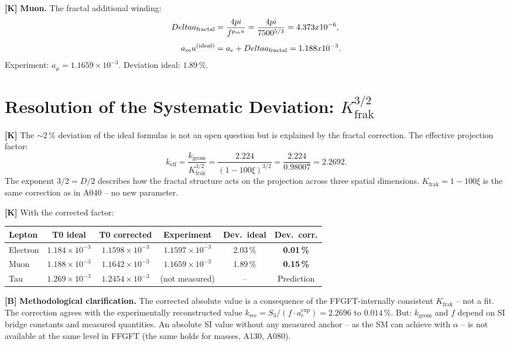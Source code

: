 \textbf{[K]} \textbf{Muon.} The fractal additional winding:
\begin{align}
  \Delta a_\text{fractal} &= \frac{4\pi}{f^{p_\mu}} = \frac{4\pi}{7500^{5/3}}
  = 4{.}373\times10^{-6}, \notag\\[4pt]
  a_\mu^\text{(ideal)} &= a_e + \Delta a_\text{fractal} = 1{.}188\times10^{-3}. \notag
\end{align}
Experiment: $a_\mu=1{.}1659\times10^{-3}$. Deviation ideal: $1{.}89\,\%$.

\section{Resolution of the Systematic Deviation: \texorpdfstring{$K_\text{frak}^{3/2}$}{K\_frak\textasciicircum 3/2}}

\textbf{[K]} The $\sim2\,\%$ deviation of the ideal formulas is not an open
question but is explained by the fractal correction. The effective projection
factor:
\[
  k_\text{eff}
  = \frac{k_\text{geom}}{K_\text{frak}^{3/2}}
  = \frac{2{.}224}{(1-100\xi)^{3/2}}
  = \frac{2{.}224}{0{.}98007}
  = 2{.}2692.
\]
The exponent $3/2=D/2$ describes how the fractal structure acts on the projection
across three spatial dimensions. $K_\text{frak}=1-100\xi$ is the same correction
as in A040 -- no new parameter.

\textbf{[K]} With the corrected factor:

\begin{center}
\renewcommand{\arraystretch}{1.3}
{\small
\begin{tabular}{lccccc}
\toprule
Lepton & T0 ideal & T0 corrected & Experiment & Dev.\ ideal & Dev.\ corr. \\
\midrule
Electron & $1{.}184\times10^{-3}$ & $1{.}1598\times10^{-3}$ & $1{.}1597\times10^{-3}$ & 2{.}03\,\% & \textbf{0{.}01\,\%} \\
Muon     & $1{.}188\times10^{-3}$ & $1{.}1642\times10^{-3}$ & $1{.}1659\times10^{-3}$ & 1{.}89\,\% & \textbf{0{.}15\,\%} \\
Tau      & $1{.}269\times10^{-3}$ & $1{.}2454\times10^{-3}$ & (not measured)          & --         & Prediction \\
\bottomrule
\end{tabular}
}
\renewcommand{\arraystretch}{1.0}
\end{center}

\textbf{[B]} \textbf{Methodological clarification.} The corrected absolute value
is a consequence of the FFGFT-internally consistent $K_\text{frak}$ -- not a fit.
The correction agrees with the experimentally reconstructed value
$k_\text{rec}=S_3/(f\cdot a_e^\text{exp})=2{.}2696$ to $0{.}014\,\%$.
But: $k_\text{geom}$ and $f$ depend on SI bridge constants and measured quantities.
An absolute SI value without any measured anchor -- as the SM can achieve with
$\alpha$ -- is not available at the same level in FFGFT (the same holds for
masses, A130, A080).


